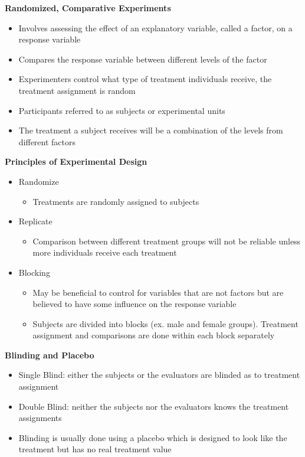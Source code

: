 \documentclass{article}
\begin{document}
\noindent
\textbf{Randomized, Comparative Experiments}
\begin{itemize}
    \item Involves assessing the effect of an explanatory variable, called a factor, on a response variable
    \item Compares the response variable between different levels of the factor
    \item Experimenters control what type of treatment individuals receive, the treatment assignment is random
    \item Participants referred to as subjects or experimental units
    \item The treatment a subject receives will be a combination of the levels from different factors 
\end{itemize}

\noindent
\textbf{Principles of Experimental Design}
\begin{itemize}
    \item Randomize
    \begin{itemize}
        \item Treatments are randomly assigned to subjects
    \end{itemize}
    \item Replicate
    \begin{itemize}
        \item Comparison between different treatment groups will not be reliable unless more individuals receive each treatment 
    \end{itemize}
    \item Blocking
    \begin{itemize}
        \item May be beneficial to control for variables that are not factors but are believed to have some influence on the response variable 
        \item Subjects are divided into blocks (ex. male and female groups). Treatment assignment and comparisons are done within each block separately 
    \end{itemize}
\end{itemize}

\noindent
\textbf{Blinding and Placebo}
\begin{itemize}
    \item Single Blind: either the subjects or the evaluators are blinded as to treatment assignment
    \item Double Blind: neither the subjects nor the evaluators knows the treatment assignments
    \item Blinding is usually done using a placebo which is designed to look like the treatment but has no real treatment value
\end{itemize}
\end{document}
